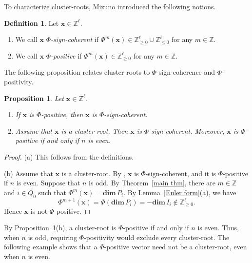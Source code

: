 \documentclass[11pt,a4paper]{amsart}
\newtheorem{proposition}[theorem]{Proposition}
\theoremstyle{definition}
\newtheorem{definition}[theorem]{Definition}
\numberwithin{equation}{section}
\newcommand{\Z}{\mathbb{Z}}
\newcommand{\x}{\mathbf{x}}
\newcommand{\0}{\mathbf{0}}
\newcommand{\dimv}{\mathbf{dim}\,}
\begin{document}
		To characterize cluster-roots, Mizuno introduced the following notions. 
		\begin{definition} \cite[Definition 5.1]{Miz} Let $\mathbf{x}\in\Z^\ell$. 
		\begin{enumerate}
			\item[(a)] We call $\x$  \emph{$\Phi$-sign-coherent} if  $\Phi^m(\x)\in \mathbb{Z}_{\geq0}^{\ell}\cup
			\mathbb{Z}_{\leq0}^{\ell}$ for any
			$m\in\Z$.	
			\item[(b)] We call $\x$ \emph{$\Phi$-positive} if
			$\Phi^m(\x)\in\Z_{\geq0}^\ell$ for any $m\in\Z$.
		\end{enumerate}
	\end{definition}
	
	The following proposition relates cluster-roots to
	$\Phi$-sign-coherence and $\Phi$-positivity.
	
	
	
	
	\begin{proposition}\label{positivity-comparison}
		Let $\x\in\Z^\ell$.
		\begin{enumerate}
			\item[(a)]
			If $\x$ is $\Phi$-positive, then $\x$ is $\Phi$-sign-coherent.
			
			\item[(b)]
			Assume that $\x$ is a cluster-root.
			Then $\x$ is $\Phi$-sign-coherent.
			Moreover, $\x$ is $\Phi$-positive if and only if $n$ is even.
		\end{enumerate}
	\end{proposition}
	\begin{proof}
		(a) This follows from the definitions.
		
		(b) Assume that $\x$ is a cluster-root. By \cite[Theorem~5.2]{Miz}, $\x$ is
		$\Phi$-sign-coherent, and it is $\Phi$-positive
		if $n$ is even. 		
		Suppose that $n$ is odd. By Theorem~\ref{main thm},
		there are $m\in\Z$ and $i\in Q_0$ such that
		$\Phi^m(\x)=\dimv P_i$.
		By Lemma~\ref{Euler form}(a), we have
		\[
		\Phi^{m+1}(\x)
		=\Phi(\dimv P_i)
		=-\dimv I_i\notin\Z_{\geq0}^{\ell}.
		\]
		Hence $\x$ is not $\Phi$-positive.
	\end{proof}
	
	By Proposition~\ref{positivity-comparison}(b), a cluster-root is
	$\Phi$-positive if and only if $n$ is even. Thus, when $n$ is odd,
	requiring $\Phi$-positivity would exclude every cluster-root. 
	The following example shows that a $\Phi$-positive vector
	need not  be a cluster-root, even when $n$ is even.
	
\end{document}
